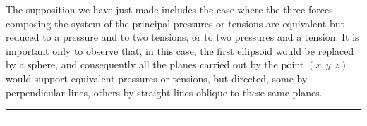 \documentclass[leqno,openright,smallroyalvopaper,8pt,twoside,showtrims]{memoir}
\begin{document}
The supposition we have just made includes the case where the three forces composing the system of the principal pressures or tensions are equivalent but reduced to a pressure and to two tensions, or to two pressures and a tension. It is important only to observe that, in this case, the first ellipsoid would be replaced by a sphere, and consequently all the planes carried out by the point $(x, y, z)$ would support equivalent pressures or tensions, but directed, some by perpendicular lines, others by straight lines oblique to these same planes.


\vspace*{.5cm}
\noindent
\rule{\textwidth}{0.5pt}\vspace*{-\baselineskip}\vspace*{2pt} 
\rule{\textwidth}{0.5pt} 
\end{document}
